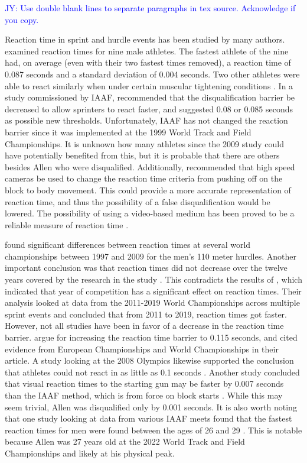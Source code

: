 \documentclass[12pt, letterpaper, titlepage]{article}
\newcommand{\jy}[1]{\textcolor{blue}{JY: #1}}
\begin{document}
\jy{Use double blank lines to separate paragraphs in tex source. Acknowledge if you copy.}

Reaction time in sprint and hurdle events has been studied by many authors.
\citet{pain2007sprint} examined reaction times for nine male athletes.  The
fastest athlete of the nine had, on average (even with their two fastest times 
removed), a reaction time of 0.087 seconds and a standard deviation of 0.004
seconds.  Two other athletes were able to react similarly when under certain
muscular tightening conditions \citep{pain2007sprint}. 
In a study commissioned by IAAF,
\citet{komi2009iaaf} recommended that the disqualification 
barrier be decreased to allow sprinters to
react faster, and suggested 0.08 or 0.085 seconds as possible new thresholds.
Unfortunately, IAAF has not changed the reaction barrier since it was
implemented at the 1999 World Track and Field Championships.
It is unknown how many athletes since the 2009 study could have potentially
benefited from this, but it is probable that there are others besides Allen who
were disqualified. Additionally,
\citet{komi2009iaaf} recommended that high speed cameras be used to
change the reaction time criteria from pushing off on the block to body
movement. This could provide a more accurate representation of reaction time, 
and thus the possibility of a false disqualification would be lowered.
The possibility of using a video-based medium has been proved to be a reliable
measure of reaction time \citep{mudric2015evaluation}.


\citet{pilianidis2012start} found
significant differences between reaction times at several world championships
between 1997 and 2009 for the men's 110 meter hurdles.  Another important
conclusion was that reaction times did not decrease over the twelve years
covered by the research in the study \citep{pilianidis2012start}. This 
contradicts the results of \citet{zhang2021correlation}, which indicated that 
year of competition has a significant effect on reaction times.  Their
analysis looked at data from the 2011-2019 World Championships across multiple
sprint events and concluded that from 2011 to 2019, reaction times got
faster. However, not all studies have been in favor of a decrease in the
reaction time barrier. \citet*{brosnan2017effects} argue for increasing 
the reaction time barrier to 0.115 seconds, and cited evidence from European 
Championships and World Championships in their article.  A study looking 
at the 2008 Olympics likewise supported the conclusion that athletes could not
react in as little as 0.1 seconds \citep{lipps2011implications}.  Another study
concluded that visual reaction times to the starting gun may be faster by 0.007
seconds than the IAAF method, which is from force on block starts 
\citep{holmes2018method}.  While this may seem trivial, Allen was disqualified
only by 0.001 seconds. It is also worth noting that one study looking at data 
from various IAAF meets found that the fastest reaction times for men were found
between the ages of 26 and 29 \citep{tonnessen2013reaction}.  This is notable 
because Allen was 27 years old at the 2022 World Track and Field Championships 
and likely at his physical peak.
\end{document}
